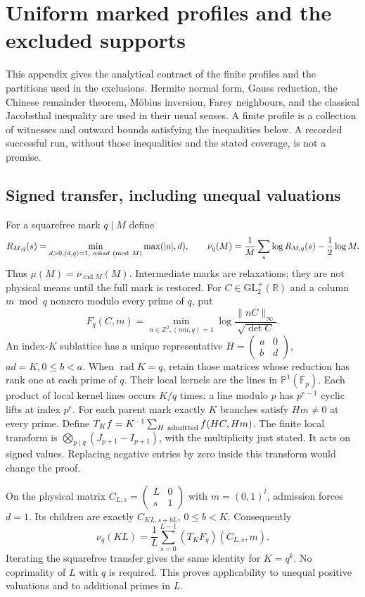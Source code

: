 \documentclass[11pt]{article}
\theoremstyle{definition}\newtheorem{definition}[theorem]{Definition}
\theoremstyle{remark}\newtheorem{remark}[theorem]{Remark}
\newcommand{\rad}{\operatorname{rad}}
\begin{document}
\section{Uniform marked profiles and the excluded supports}
\label{app:sharp-exclusions}

This appendix gives the analytical contract of the finite profiles and
the partitions used in the exclusions. Hermite normal form, Gauss
reduction, the Chinese remainder theorem, M\"obius inversion, Farey
neighbours, and the classical Jacobsthal inequality are used in their
usual senses. A finite profile is a collection of witnesses and outward
bounds satisfying the inequalities below. A recorded successful run,
without those inequalities and the stated coverage, is not a premise.

\subsection{Signed transfer, including unequal valuations}
For a squarefree mark \(q\mid M\) define
\[
 R_{M,q}(s)=\min_{d>0,(d,q)=1,\ a\equiv sd\ ({\rm mod}\ M)}
             \max(|a|,d),\qquad
 \nu_q(M)=\frac1M\sum_s\log R_{M,q}(s)-\frac12\log M .
\]
Thus \(\mu(M)=\nu_{\rad M}(M)\). Intermediate marks are relaxations;
they are not physical means until the full mark is restored.
For \(C\in\mathrm{GL}_2^+(\mathbb R)\) and a column \(m\bmod q\)
nonzero modulo every prime of \(q\), put
\[
 F_q(C,m)=\min_{n\in\mathbb Z^2,(nm,q)=1}
                   \log\frac{\|nC\|_\infty}{\sqrt{\det C}}.
                                                                    \tag{E1}
\]
An index-\(K\) sublattice has a unique representative
\(H=\left(\begin{smallmatrix}a&0\\b&d\end{smallmatrix}\right)\),
\(ad=K,0\le b<a\). When \(\rad K=q\), retain those matrices whose
reduction has rank one at each prime of \(q\). Their local kernels
are the lines in \(\mathbb P^1(\mathbb F_p)\). Each product of local
kernel lines occurs \(K/q\) times: a line modulo \(p\) has
\(p^{e-1}\) cyclic lifts at index \(p^e\). For each parent mark
exactly \(K\) branches satisfy \(Hm\ne0\) at every prime.
Define \(T_Kf=K^{-1}\sum_{H\ {\rm admitted}}f(HC,Hm)\).
The finite local transform is
\(\bigotimes_{p\mid q}(J_{p+1}-I_{p+1})\), with the multiplicity just
stated. It acts on signed values. Replacing negative entries by zero
inside this transform would change the proof.

On the physical matrix
\(C_{L,s}=\left(\begin{smallmatrix}L&0\\s&1\end{smallmatrix}\right)\)
with \(m=(0,1)^t\), admission forces \(d=1\). Its children are
exactly \(C_{KL,s+bL}\), \(0\le b<K\). Consequently
\[
 \nu_q(KL)=\frac1L\sum_{s=0}^{L-1}(T_KF_q)(C_{L,s},m).
                                                                    \tag{E2}
\]
Iterating the squarefree transfer gives the same identity for \(K=q^k\).
No coprimality of \(L\) with \(q\) is required. This proves applicability
to unequal positive valuations and to additional primes in \(L\).
\end{document}
